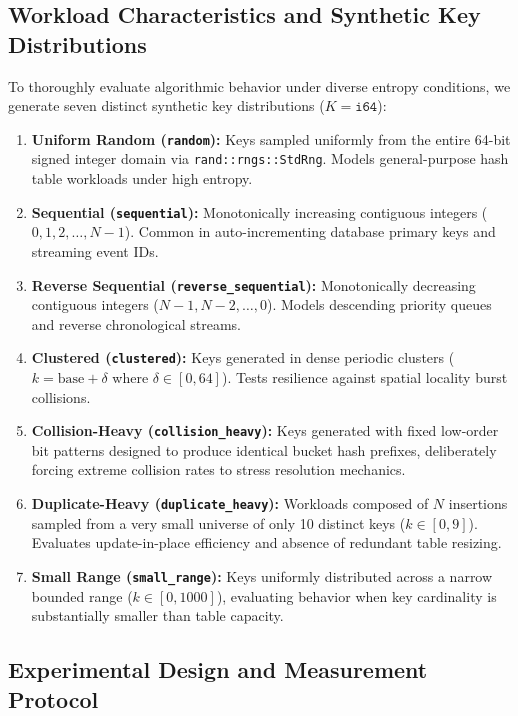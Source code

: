 \documentclass[conference]{IEEEtran}
\begin{document}
\subsection{Workload Characteristics and Synthetic Key Distributions}

To thoroughly evaluate algorithmic behavior under diverse entropy conditions, we generate seven distinct synthetic key distributions ($K = \texttt{i64}$):
\begin{enumerate}
  \item \textbf{Uniform Random (\texttt{random}):} Keys sampled uniformly from the entire 64-bit signed integer domain via \texttt{rand::rngs::StdRng}. Models general-purpose hash table workloads under high entropy.
  \item \textbf{Sequential (\texttt{sequential}):} Monotonically increasing contiguous integers ($0, 1, 2, \dots, N - 1$). Common in auto-incrementing database primary keys and streaming event IDs.
  \item \textbf{Reverse Sequential (\texttt{reverse\_sequential}):} Monotonically decreasing contiguous integers ($N - 1, N - 2, \dots, 0$). Models descending priority queues and reverse chronological streams.
  \item \textbf{Clustered (\texttt{clustered}):} Keys generated in dense periodic clusters ($k = \text{base} + \delta$ where $\delta \in [0, 64]$). Tests resilience against spatial locality burst collisions.
  \item \textbf{Collision-Heavy (\texttt{collision\_heavy}):} Keys generated with fixed low-order bit patterns designed to produce identical bucket hash prefixes, deliberately forcing extreme collision rates to stress resolution mechanics.
  \item \textbf{Duplicate-Heavy (\texttt{duplicate\_heavy}):} Workloads composed of $N$ insertions sampled from a very small universe of only 10 distinct keys ($k \in [0, 9]$). Evaluates update-in-place efficiency and absence of redundant table resizing.
  \item \textbf{Small Range (\texttt{small\_range}):} Keys uniformly distributed across a narrow bounded range ($k \in [0, 1000]$), evaluating behavior when key cardinality is substantially smaller than table capacity.
\end{enumerate}

\subsection{Experimental Design and Measurement Protocol}
\end{document}
